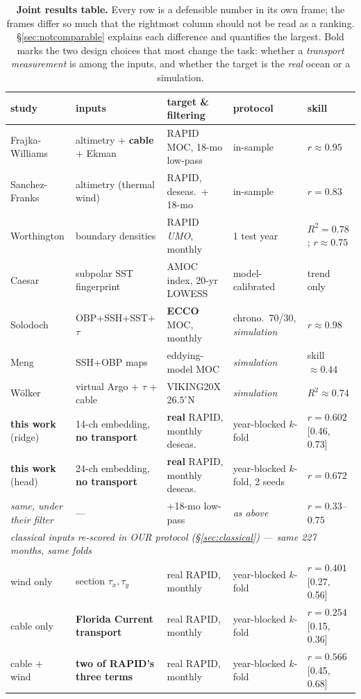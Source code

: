 \documentclass[10pt]{article}
\begin{document}
\begin{table}[t]
\centering\small
\begin{tabular}{p{2.6cm}p{3.0cm}p{2.5cm}p{2.4cm}l}
\toprule
study & inputs & target \& filtering & protocol & skill \\
\midrule
Frajka-Williams \cite{fw2015} & altimetry + \textbf{cable} + Ekman &
RAPID MOC, 18-mo low-pass & in-sample & $r\approx0.95$ \\
Sanchez-Franks \cite{sf2021} & altimetry (thermal wind) &
RAPID, deseas.\ + 18-mo & in-sample & $r=0.83$ \\
Worthington \cite{worthington} & boundary densities &
RAPID \emph{UMO}, monthly & 1 test year & $R^2=0.78$; $r\approx0.75$ \\
Caesar \cite{caesar} & subpolar SST fingerprint &
AMOC index, 20-yr LOWESS & model-calibrated & trend only \\
Solodoch \cite{solodoch} & OBP+SSH+SST+$\tau$ &
\textbf{ECCO} MOC, monthly & chrono.\ 70/30, \emph{simulation} & $r\approx0.98$ \\
Meng \cite{meng} & SSH+OBP maps &
eddying-model MOC & \emph{simulation} & skill $\approx0.44$ \\
W\"olker \cite{woelker} & virtual Argo + $\tau$ + cable &
VIKING20X $26.5^\circ$N & \emph{simulation} & $R^2\approx0.74$ \\
\midrule
\textbf{this work} (ridge) & 14-ch embedding, \textbf{no transport} &
\textbf{real} RAPID, monthly deseas. & year-blocked $k$-fold &
$r=0.602$ [0.46, 0.73] \\
\textbf{this work} (head) & 24-ch embedding, \textbf{no transport} &
\textbf{real} RAPID, monthly deseas. & year-blocked $k$-fold, 2 seeds &
$r=0.672$ \\
\emph{same, under their filter} & --- & +18-mo low-pass &
\emph{as above} & $r=0.33$--$0.75$ \\
\midrule
\multicolumn{5}{l}{\emph{classical inputs re-scored in OUR protocol
(\S\ref{sec:classical}) --- same 227 months, same folds}}\\
\quad wind only & section $\tau_x,\tau_y$ & real RAPID, monthly &
year-blocked $k$-fold & $r=0.401$ [0.27, 0.56] \\
\quad cable only & \textbf{Florida Current transport} & real RAPID, monthly &
year-blocked $k$-fold & $r=0.254$ [0.15, 0.36] \\
\quad cable + wind & \textbf{two of RAPID's three terms} & real RAPID, monthly &
year-blocked $k$-fold & $r=0.566$ [0.45, 0.68] \\
\bottomrule
\end{tabular}
\caption{\textbf{Joint results table.} Every row is a defensible number
in its own frame; the frames differ so much that the rightmost column
should not be read as a ranking. \S\ref{sec:notcomparable} explains each
difference and quantifies the largest. Bold marks the two design
choices that most change the task: whether a \emph{transport
measurement} is among the inputs, and whether the target is the
\emph{real} ocean or a simulation.}
\label{tab:related}
\end{table}
\end{document}
